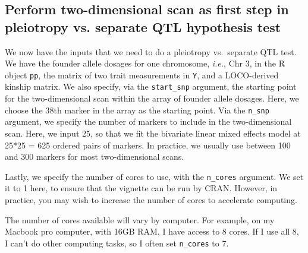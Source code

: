\documentclass[oneside]{book}\usepackage[]{graphicx}\usepackage[]{color}
\newenvironment{Shaded}{\begin{snugshade}}{\end{snugshade}}
\newcommand{\CommentTok}[1]{\textcolor[rgb]{0.56,0.35,0.01}{\textit{#1}}}
\newcommand{\DataTypeTok}[1]{\textcolor[rgb]{0.13,0.29,0.53}{#1}}
\newcommand{\DecValTok}[1]{\textcolor[rgb]{0.00,0.00,0.81}{#1}}
\newcommand{\KeywordTok}[1]{\textcolor[rgb]{0.13,0.29,0.53}{\textbf{#1}}}
\newcommand{\NormalTok}[1]{#1}
\newcommand{\OperatorTok}[1]{\textcolor[rgb]{0.81,0.36,0.00}{\textbf{#1}}}
\newcommand{\StringTok}[1]{\textcolor[rgb]{0.31,0.60,0.02}{#1}}
\begin{document}
\hypertarget{perform-two-dimensional-scan-as-first-step-in-pleiotropy-vs.-separate-qtl-hypothesis-test}{%
\subsection{Perform two-dimensional scan as first step in pleiotropy vs.
separate QTL hypothesis
test}\label{perform-two-dimensional-scan-as-first-step-in-pleiotropy-vs.-separate-qtl-hypothesis-test}}

We now have the inputs that we need to do a pleiotropy vs.~separate QTL
test. We have the founder allele dosages for one chromosome,
\emph{i.e.}, Chr 3, in the R object \texttt{pp}, the matrix of two trait
measurements in \texttt{Y}, and a LOCO-derived kinship matrix. We also
specify, via the \texttt{start\_snp} argument, the starting point for
the two-dimensional scan within the array of founder allele dosages.
Here, we choose the 38th marker in the array as the starting point. Via
the \texttt{n\_snp} argument, we specify the number of markers to
include in the two-dimensional scan. Here, we input 25, so that we fit
the bivariate linear mixed effects model at 25*25 = 625 ordered pairs of
markers. In practice, we usually use between 100 and 300 markers for
most two-dimensional scans.

Lastly, we specify the number of cores to use, with the
\texttt{n\_cores} argument. We set it to 1 here, to ensure that the
vignette can be run by CRAN. However, in practice, you may wish to
increase the number of cores to accelerate computing.

\begin{Shaded}
\end{Shaded}

The number of cores available will vary by computer. For example, on my
Macbook pro computer, with 16GB RAM, I have access to 8 cores. If I use
all 8, I can't do other computing tasks, so I often set
\texttt{n\_cores} to 7.
\end{document}

